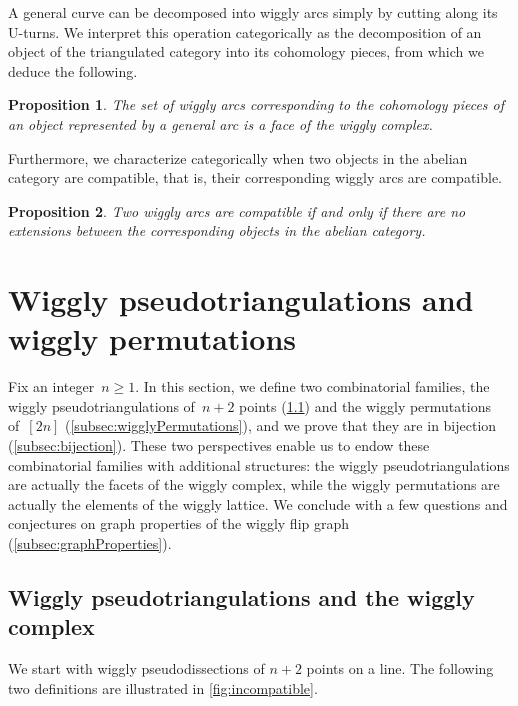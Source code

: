 \documentclass{amsart}
\newtheorem*{proposition*}{Proposition}%
\theoremstyle{definition}
\begin{document}
A general curve can be decomposed into wiggly arcs simply by cutting along its U-turns.
We interpret this operation categorically as the decomposition of an object of the triangulated category into its cohomology pieces, from which we deduce the following.

\begin{proposition*}
The set of wiggly arcs corresponding to the cohomology pieces of an object represented by a general arc is a face of the wiggly complex.
\end{proposition*}

Furthermore, we characterize categorically when two objects in the abelian category are compatible, that is, their corresponding wiggly arcs are compatible.

\begin{proposition*}
Two wiggly arcs are compatible if and only if there are no extensions between the corresponding objects in the abelian category.
\end{proposition*}


\section{Wiggly pseudotriangulations and wiggly permutations}
\label{sec:combinatorics}

Fix an integer~$n \ge 1$.
In this section, we define two combinatorial families, the wiggly pseudotriangulations of~$n+2$ points (\cref{subsec:wigglyPseudotriangulations}) and the wiggly permutations of~$[2n]$ (\cref{subsec:wigglyPermutations}), and we prove that they are in bijection (\cref{subsec:bijection}).
These two perspectives enable us to endow these combinatorial families with additional structures: the wiggly pseudotriangulations are actually the facets of the wiggly complex, while the wiggly permutations are actually the elements of the wiggly lattice.
We conclude with a few questions and conjectures on graph properties of the wiggly flip graph (\cref{subsec:graphProperties}).


\subsection{Wiggly pseudotriangulations and the wiggly complex}
\label{subsec:wigglyPseudotriangulations}

We start with wiggly pseudodissections of $n+2$ points on a line.
The following two definitions are illustrated in \cref{fig:incompatible}.
\end{document}

